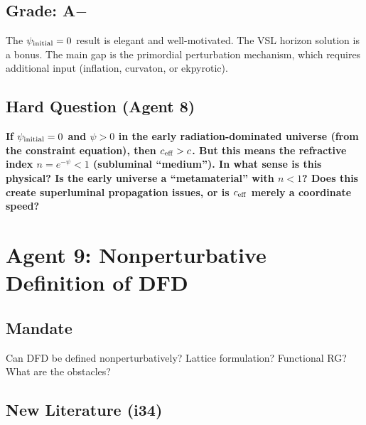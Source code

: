 \documentclass[11pt,a4paper]{article}
\begin{document}
\subsection{Grade: A$-$}

The $\psi_{\rm initial} = 0$ result is elegant and well-motivated. The VSL horizon solution is a bonus. The main gap is the primordial perturbation mechanism, which requires additional input (inflation, curvaton, or ekpyrotic).

\subsection{Hard Question (Agent 8)}

\textbf{If $\psi_{\rm initial} = 0$ and $\psi > 0$ in the early radiation-dominated universe (from the constraint equation), then $c_{\rm eff} > c$. But this means the refractive index $n = e^{-\psi} < 1$ (subluminal ``medium''). In what sense is this physical? Is the early universe a ``metamaterial'' with $n < 1$? Does this create superluminal propagation issues, or is $c_{\rm eff}$ merely a coordinate speed?}

\newpage

\section{Agent 9: Nonperturbative Definition of DFD}
\label{sec:agent9}

\subsection{Mandate}

Can DFD be defined nonperturbatively? Lattice formulation? Functional RG? What are the obstacles?

\subsection{New Literature (i34)}
\end{document}
